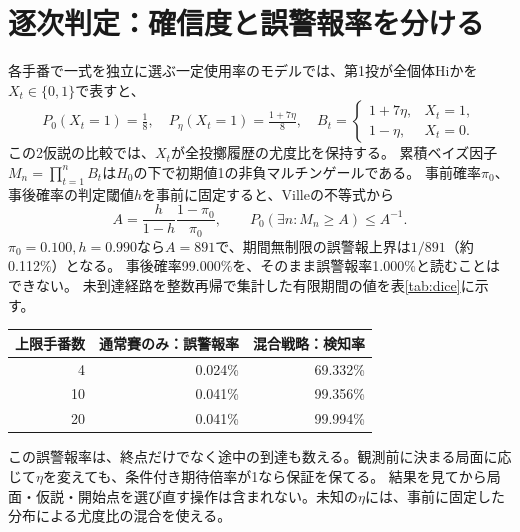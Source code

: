 \documentclass[10pt,a4paper]{article}
\newcommand{\Hi}{\mathrm{Hi}}
\begin{document}
\newpage
\section{逐次判定：確信度と誤警報率を分ける}
各手番で一式を独立に選ぶ一定使用率のモデルでは、第1投が全個体$\Hi$かを$X_t\in\{0,1\}$で表すと、
\begin{equation}
 P_0(X_t=1)=\tfrac18,\quad P_\eta(X_t=1)=\tfrac{1+7\eta}{8},\quad
 B_t=\begin{cases}1+7\eta,&X_t=1,\\1-\eta,&X_t=0.\end{cases}
\end{equation}
この2仮説の比較では、$X_t$が全投擲履歴の尤度比を保持する。
累積ベイズ因子$M_n=\prod_{t=1}^nB_t$は$H_0$の下で初期値1の非負マルチンゲールである。
事前確率$\pi_0$、事後確率の判定閾値$h$を事前に固定すると、Villeの不等式から\cite{howard}
\begin{equation}
 A=\frac{h}{1-h}\frac{1-\pi_0}{\pi_0},\qquad
 P_0\!\left(\exists n:M_n\ge A\right)\le A^{-1}.
 \label{eq:ville}
\end{equation}
$\pi_0=0.100,h=0.990$なら$A=891$で、期間無制限の誤警報上界は$1/891$（約0.112\%）となる。
事後確率99.000\%を、そのまま誤警報率1.000\%と読むことはできない。
未到達経路を整数再帰で集計した有限期間の値を表\ref{tab:dice}に示す。

\begin{center}
\label{tab:dice}
\small
\begin{tabular}{rrr}
\toprule 上限手番数 & 通常賽のみ：誤警報率 & 混合戦略：検知率\\
\midrule 4 & 0.024\% & 69.332\%\\
10 & 0.041\% & 99.356\%\\
20 & 0.041\% & 99.994\%\\
\bottomrule
\end{tabular}
\end{center}
この誤警報率は、終点だけでなく途中の到達も数える。観測前に決まる局面に応じて$\eta$を変えても、条件付き期待倍率が1なら保証を保てる。
結果を見てから局面・仮説・開始点を選び直す操作は含まれない。未知の$\eta$には、事前に固定した分布による尤度比の混合を使える。
\end{document}
